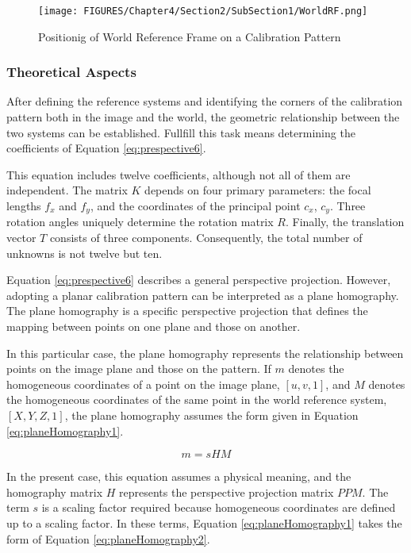 \begin{figure}[htbp]
  \centering
  \texttt{[image: FIGURES/Chapter4/Section2/SubSection1/WorldRF.png]} 
  \caption{Positionig of World Reference Frame on a Calibration Pattern} 
  \label{fig:worldRF}  
\end{figure}

\subsubsection{Theoretical Aspects}

After defining the reference systems and identifying the corners of the calibration pattern both in the image and the world, the geometric relationship between the two systems can be established. Fullfill this task means determining the coefficients of Equation \ref{eq:prespective6}.

This equation includes twelve coefficients, although not all of them are independent. The matrix $K$ depends on four primary parameters: the focal lengths $f_x$ and $f_y$, and the coordinates of the principal point $c_x$, $c_y$. Three rotation angles uniquely determine the rotation matrix $R$. Finally, the translation vector $T$ consists of three components. Consequently, the total number of unknowns is not twelve but ten.

Equation \ref{eq:prespective6} describes a general perspective projection. However, adopting a planar calibration pattern can be interpreted as a plane homography. The plane homography is a specific perspective projection that defines the mapping between points on one plane and those on another. 

In this particular case, the plane homography represents the relationship between points on the image plane and those on the pattern. If $m$ denotes the homogeneous coordinates of a point on the image plane, $[u, v, 1]$, and $M$ denotes the homogeneous coordinates of the same point in the world reference system, $[X, Y, Z, 1]$, the plane homography assumes the form given in Equation \ref{eq:planeHomography1}.

\begin{equation} 
  \label{eq:planeHomography1}
  m = sHM
\end{equation}

In the present case, this equation assumes a physical meaning, and the homography matrix $H$ represents the perspective projection matrix $PPM$. The term $s$ is a scaling factor required because homogeneous coordinates are defined up to a scaling factor.  
In these terms, Equation \ref{eq:planeHomography1} takes the form of Equation \ref{eq:planeHomography2}.

